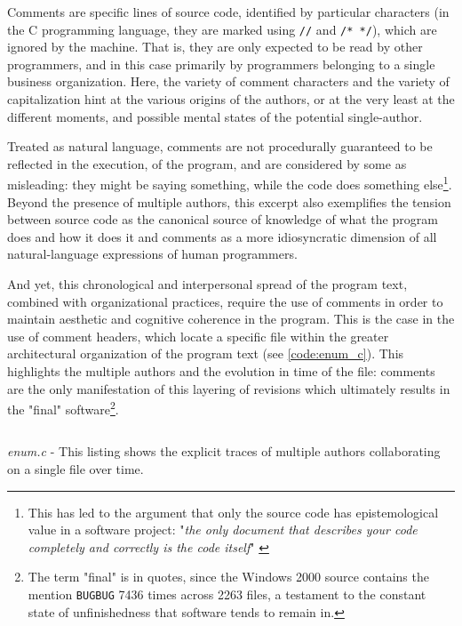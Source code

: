 Comments are specific lines of source code, identified by particular characters (in the C programming language, they are marked using \lstinline{//} and \lstinline{/* */}), which are ignored by the machine. That is, they are only expected to be read by other programmers, and in this case primarily by programmers belonging to a single business organization. Here, the variety of comment characters and the variety of capitalization hint at the various origins of the authors, or at the very least at the different moments, and possible mental states of the potential single-author.

Treated as natural language, comments are not procedurally guaranteed to be reflected in the execution, of the program, and are considered by some as misleading: they might be saying something, while the code does something else\footnote{This has led to the argument that only the source code has epistemological value in a software project: "\emph{the only document that describes your code completely and correctly is the code itself}" \citep{goodliffe_code_2007}}. Beyond the presence of multiple authors, this excerpt also exemplifies the tension between source code as the canonical source of knowledge of what the program does and how it does it and comments as a more idiosyncratic dimension of all natural-language expressions of human programmers.

And yet, this chronological and interpersonal spread of the program text, combined with organizational practices, require the use of comments in order to maintain aesthetic and cognitive coherence in the program. This is the case in the use of comment headers, which locate a specific file within the greater architectural organization of the program text (see \autoref{code:enum_c}). This highlights the multiple authors and the evolution in time of the file: comments are the only manifestation of this layering of revisions which ultimately results in the "final" software\footnote{The term "final" is in quotes, since the Windows 2000 source contains the mention \lstinline{BUGBUG} 7436 times across 2263 files, a testament to the constant state of unfinishedness that software tends to remain in.}.

\begin{listing}
  \inputminted{c}{./corpus/enum.c}
  \caption{\emph{enum.c} -  This listing shows the explicit traces of multiple authors collaborating on a single file over time.}
  \label{code:enum_c}
\end{listing}

